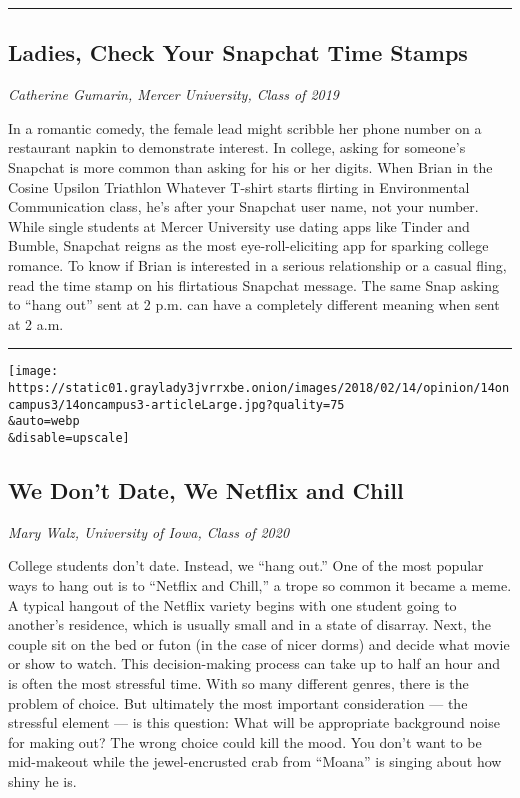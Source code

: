 \begin{center}\rule{0.5\linewidth}{\linethickness}\end{center}

\hypertarget{ladies-check-your-snapchat-time-stamps}{%
\subsection{Ladies, Check Your Snapchat Time
Stamps}\label{ladies-check-your-snapchat-time-stamps}}

\emph{Catherine Gumarin, Mercer University, Class of 2019}

In a romantic comedy, the female lead might scribble her phone number on
a restaurant napkin to demonstrate interest. In college, asking for
someone's Snapchat is more common than asking for his or her digits.
When Brian in the Cosine Upsilon Triathlon Whatever T-shirt starts
flirting in Environmental Communication class, he's after your Snapchat
user name, not your number. While single students at Mercer University
use dating apps like Tinder and Bumble, Snapchat reigns as the most
eye-roll-eliciting app for sparking college romance. To know if Brian is
interested in a serious relationship or a casual fling, read the time
stamp on his flirtatious Snapchat message. The same Snap asking to
``hang out'' sent at 2 p.m. can have a completely different meaning when
sent at 2 a.m.

\begin{center}\rule{0.5\linewidth}{\linethickness}\end{center}

\texttt{[image: https://static01.graylady3jvrrxbe.onion/images/2018/02/14/opinion/14oncampus3/14oncampus3-articleLarge.jpg?quality=75\\\&auto=webp\\\&disable=upscale]}

\hypertarget{we-dont-date-we-netflix-and-chill}{%
\subsection{We Don't Date, We Netflix and
Chill}\label{we-dont-date-we-netflix-and-chill}}

\emph{Mary Walz, University of Iowa, Class of 2020}

College students don't date. Instead, we ``hang out.'' One of the most
popular ways to hang out is to ``Netflix and Chill,'' a trope so common
it became a meme. A typical hangout of the Netflix variety begins with
one student going to another's residence, which is usually small and in
a state of disarray. Next, the couple sit on the bed or futon (in the
case of nicer dorms) and decide what movie or show to watch. This
decision-making process can take up to half an hour and is often the
most stressful time. With so many different genres, there is the problem
of choice. But ultimately the most important consideration --- the
stressful element --- is this question: What will be appropriate
background noise for making out? The wrong choice could kill the mood.
You don't want to be mid-makeout while the jewel-encrusted crab from
``Moana'' is singing about how shiny he is.

